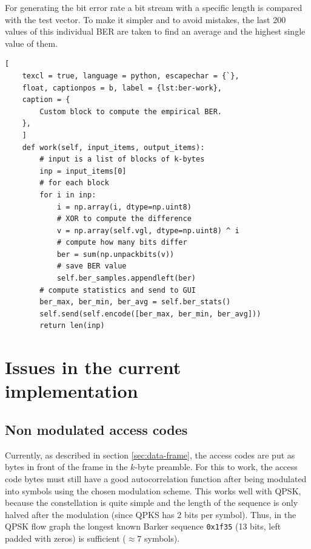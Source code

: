 For generating the bit error rate a bit stream with a specific length is compared with the test vector. To make it simpler and to avoid mistakes, the last 200 values of this individual BER are taken to find an average and the highest single value of them. 


\begin{lstlisting}[
	texcl = true, language = python, escapechar = {`},
	float, captionpos = b, label = {lst:ber-work},
	caption = {
		Custom block to compute the empirical BER.
	},
	]
	def work(self, input_items, output_items):
		# input is a list of blocks of k-bytes
		inp = input_items[0]
		# for each block
		for i in inp:
			i = np.array(i, dtype=np.uint8)
			# XOR to compute the difference
			v = np.array(self.vgl, dtype=np.uint8) ^ i
			# compute how many bits differ
			ber = sum(np.unpackbits(v))
			# save BER value
			self.ber_samples.appendleft(ber)
		# compute statistics and send to GUI
		ber_max, ber_min, ber_avg = self.ber_stats()
		self.send(self.encode([ber_max, ber_min, ber_avg]))
		return len(inp)
\end{lstlisting}

\section{Issues in the current implementation}

\subsection{Non modulated access codes} \label{sec:access-code-issue}

Currently, as described in section \ref{sec:data-frame}, the access codes are put as bytes in front of the frame in the \(k\)-byte preamble. For this to work, the access code bytes must still have a good autocorrelation function after being modulated into symbols using the chosen modulation scheme. This works well with QPSK, because the constellation is quite simple and the length of the sequence is only halved after the modulation (since QPKS has 2 bits per symbol). Thus, in the QPSK flow graph the longest known Barker sequence  \texttt{0x1f35} (13 bits, left padded with zeros) is sufficient (\(\approx 7\) symbols).

